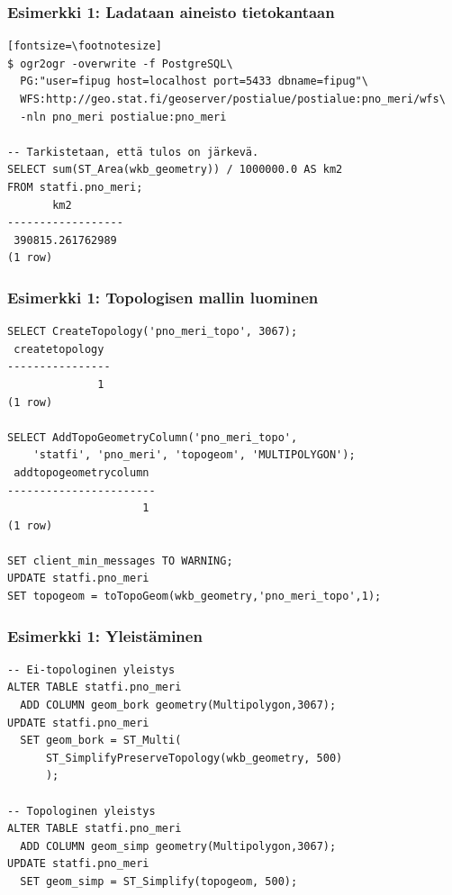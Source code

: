 \documentclass[english,finnish]{beamer}
\begin{document}
\begin{frame}[fragile=singleslide]\frametitle{Esimerkki 1: Ladataan
    aineisto tietokantaan}
\begin{verbatim}[fontsize=\footnotesize]
$ ogr2ogr -overwrite -f PostgreSQL\
  PG:"user=fipug host=localhost port=5433 dbname=fipug"\
  WFS:http://geo.stat.fi/geoserver/postialue/postialue:pno_meri/wfs\
  -nln pno_meri postialue:pno_meri

-- Tarkistetaan, että tulos on järkevä.
SELECT sum(ST_Area(wkb_geometry)) / 1000000.0 AS km2
FROM statfi.pno_meri;
       km2        
------------------
 390815.261762989
(1 row)
\end{verbatim}
\end{frame}

\begin{frame}[fragile=singleslide]\frametitle{Esimerkki 1: Topologisen mallin luominen}
\begin{verbatim}
SELECT CreateTopology('pno_meri_topo', 3067);
 createtopology 
----------------
              1
(1 row)

SELECT AddTopoGeometryColumn('pno_meri_topo',
    'statfi', 'pno_meri', 'topogeom', 'MULTIPOLYGON');
 addtopogeometrycolumn 
-----------------------
                     1
(1 row)

SET client_min_messages TO WARNING;
UPDATE statfi.pno_meri
SET topogeom = toTopoGeom(wkb_geometry,'pno_meri_topo',1);
\end{verbatim}
\end{frame}

\begin{frame}[fragile=singleslide]\frametitle{Esimerkki 1: Yleistäminen}
\begin{verbatim}
-- Ei-topologinen yleistys
ALTER TABLE statfi.pno_meri
  ADD COLUMN geom_bork geometry(Multipolygon,3067);
UPDATE statfi.pno_meri
  SET geom_bork = ST_Multi(
      ST_SimplifyPreserveTopology(wkb_geometry, 500)
      );

-- Topologinen yleistys
ALTER TABLE statfi.pno_meri
  ADD COLUMN geom_simp geometry(Multipolygon,3067);
UPDATE statfi.pno_meri
  SET geom_simp = ST_Simplify(topogeom, 500);
\end{verbatim}
\end{frame}
\end{document}
